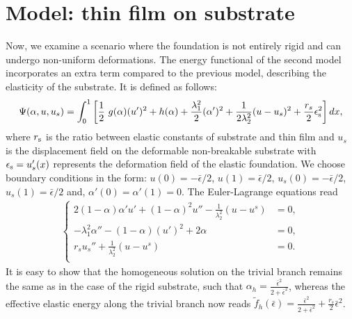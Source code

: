 \section{Model: thin film  on   substrate }
\label{sec:non-rigid}

Now, we examine a scenario where the foundation is not entirely rigid and can undergo non-uniform deformations. The energy functional of the second model incorporates an extra term compared to the previous model, describing the elasticity of the substrate. It is defined as follows:
\begin{equation}
\label{model_elastic_substrate}
\Psi(\alpha, u,u_s) = \int_{0}^1 \left[ \frac{1}{2} \ g(\alpha)(u')^2 + h(\alpha) + \frac{\lambda_1^2}{2}(\alpha')^2 
+ \frac{1}{2 \lambda_2^2} (u-u_s)^2 
+ \frac{r_{s}}{2}  \epsilon_{\rm s}^2 \right] dx,
\end{equation}
where $r_{\rm s}$ is the ratio between elastic constants of substrate and thin film and $u_s$ is the displacement field on the deformable non-breakable substrate with $\epsilon_{\rm s}=u_s'(x)$ represents the deformation field of the elastic foundation. We  choose boundary conditions in the form: $u(0)=-\bar\epsilon/2$, $u(1)=\bar\epsilon/2$,  $u_s(0)=-\bar\epsilon/2$, $u_s(1)=\bar\epsilon/2$ and, $\alpha'(0)=\alpha'(1)=0$.  The Euler-Lagrange equations read
\begin{eqnarray}\label{modeld_el_1}
\begin{cases}
  2(1-\alpha)\alpha' u' +(1-\alpha)^2 u'' -  \frac{1}{\lambda_2^2}(u-u^s) &= 0, \\
  -\lambda_1^2\alpha'' - (1-\alpha)( u')^2 + 2\alpha   &= 0,\\
    r_su_s''  +  \frac{1}{\lambda_2^2}(u-u^s) &= 0. \\
\end{cases}
\label{auto2}
\end{eqnarray}
It is easy to show that the homogeneous solution on the trivial branch remains the same as in the case of the rigid substrate, such that $\alpha_h = \frac{\bar{\epsilon}^2}{2 + \bar{\epsilon}^2}\label{eq:homo11}$, whereas the effective elastic energy along the trivial branch now reads $\tilde f_h(\bar{\epsilon}) = \frac{\bar{\epsilon}^2}{2 + \bar{\epsilon}^2} + \frac{r_s}{2}\bar{\epsilon}^2$. 

